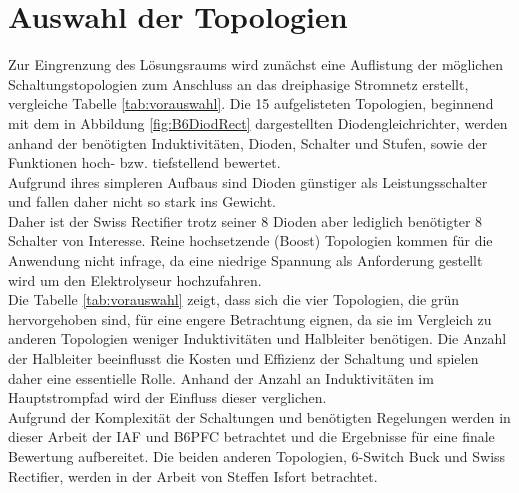 \section{Auswahl der Topologien}
Zur Eingrenzung des Lösungsraums wird zunächst eine Auflistung der möglichen Schaltungstopologien zum Anschluss an das dreiphasige Stromnetz erstellt, vergleiche Tabelle \ref{tab:vorauswahl}. Die 15 aufgelisteten Topologien, beginnend mit dem in Abbildung \ref{fig:B6DiodRect} dargestellten Diodengleichrichter, werden anhand der benötigten Induktivitäten, Dioden, Schalter und Stufen, sowie der Funktionen hoch- bzw. tiefstellend bewertet.\\
Aufgrund ihres simpleren Aufbaus sind Dioden günstiger als Leistungsschalter und fallen daher nicht so stark ins Gewicht. \\
Daher ist der Swiss Rectifier trotz seiner 8 Dioden aber lediglich benötigter 8 Schalter von Interesse. Reine hochsetzende (Boost) Topologien kommen für die Anwendung nicht infrage, da eine niedrige Spannung als Anforderung gestellt wird um den Elektrolyseur hochzufahren. \\
Die Tabelle \ref{tab:vorauswahl} zeigt, dass sich die vier Topologien, die grün hervorgehoben sind, für eine engere Betrachtung eignen, da sie im Vergleich zu anderen Topologien weniger Induktivitäten und Halbleiter benötigen. Die Anzahl der Halbleiter beeinflusst die Kosten und Effizienz der Schaltung und spielen daher eine essentielle Rolle. Anhand der Anzahl an Induktivitäten im Hauptstrompfad wird der Einfluss dieser verglichen. \\
Aufgrund der Komplexität der Schaltungen und benötigten Regelungen werden in dieser Arbeit der \gls{IAF} und \gls{B6PFC} betrachtet und die Ergebnisse für eine finale Bewertung aufbereitet. Die beiden anderen Topologien, 6-Switch Buck und Swiss Rectifier, werden in  der Arbeit von Steffen Isfort betrachtet.

